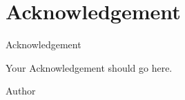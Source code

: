 
\clearpage
\chapter*{Acknowledgement}
\thispagestyle{empty}
\begin{center}
    \fontsize{12}{20} \selectfont Acknowledgement
\end{center}
\par

Your Acknowledgement should go here. 

\bigskip
\noindent
Author

\noindent
\Author

